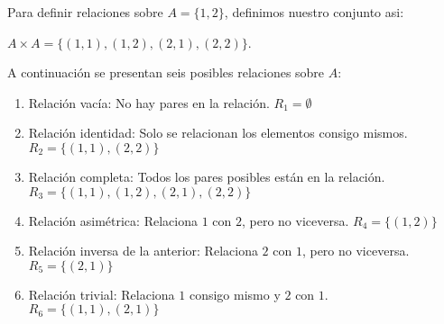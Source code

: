 \begin{solution}
    Para definir relaciones sobre \( A = \{1, 2\} \), definimos nuestro conjunto asi: 
    
    \( A \times A = \{(1, 1), (1, 2), (2, 1), (2, 2)\} \).

    A continuación se presentan seis posibles relaciones sobre \( A \):

    \begin{enumerate}
        \item Relación vacía: No hay pares en la relación.  
        \( R_1 = \emptyset \)

        \item Relación identidad: Solo se relacionan los elementos consigo mismos.  
        \( R_2 = \{(1, 1), (2, 2)\} \)

        \item Relación completa: Todos los pares posibles están en la relación.  
           \( R_3 = \{(1, 1), (1, 2), (2, 1), (2, 2)\} \)
        
        \item Relación asimétrica: Relaciona \( 1 \) con \( 2 \), pero no viceversa.  
           \( R_4 = \{(1, 2)\} \)
        
        \item Relación inversa de la anterior: Relaciona \( 2 \) con \( 1 \), pero no viceversa.  
           \( R_5 = \{(2, 1)\} \)
        
        \item Relación trivial: Relaciona \( 1 \) consigo mismo y \( 2 \) con \( 1 \).  
           \( R_6 = \{(1, 1), (2, 1)\} \)
    \end{enumerate}
\end{solution}